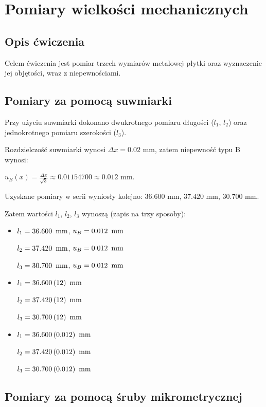 \documentclass[a4paper]{article}
\begin{document}
\section{Pomiary wielkości mechanicznych}

\subsection{Opis ćwiczenia}
Celem ćwiczenia jest pomiar trzech wymiarów metalowej płytki oraz wyznaczenie jej objętości, wraz z niepewnościami.

\subsection{Pomiary za pomocą suwmiarki}

Przy użyciu suwmiarki dokonano dwukrotnego pomiaru długości ($l_1$, $l_2$) oraz jednokrotnego pomiaru szerokości ($l_3$).

Rozdzielczość suwmiarki wynosi $\Delta x = 0.02$ mm, zatem niepewność typu B wynosi: 

$u_B(x) = \frac{\Delta x}{\sqrt{3}} \approx 0.01154700 \approx 0.012$ mm.

Uzyskane pomiary w serii wyniosły kolejno: $36.600$ mm, $37.420$ mm, $30.700$ mm.

Zatem wartości $l_1$, $l_2$, $l_3$ wynoszą (zapis na trzy sposoby):


\begin{itemize}
\item $l_1 = 36.600 \enskip \text{mm}$, $u_B = 0.012 \enskip \text{mm}$

$l_2 = 37.420 \enskip \text{mm}$, $u_B = 0.012 \enskip \text{mm}$

$l_3 = 30.700 \enskip \text{mm}$, $u_B = 0.012 \enskip \text{mm}$

\item $l_1 = 36.600 \, (12) \enskip \text{mm}$

$l_2 = 37.420 \, (12) \enskip \text{mm}$ 

$l_3 = 30.700 \, (12) \enskip \text{mm}$

\item $l_1 = 36.600 \, (0.012) \enskip \text{mm}$

$l_2 = 37.420 \, (0.012) \enskip \text{mm}$

$l_3 = 30.700 \, (0.012) \enskip \text{mm}$
\end{itemize}

\subsection{Pomiary za pomocą śruby mikrometrycznej}
\end{document}

